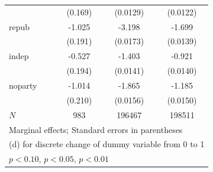 {\begin{tabular}{l*{3}{c}}
            &     (0.169)         &    (0.0129)         &    (0.0122)         \\
[1em]
repub       &      -1.025\sym{***}&      -3.198\sym{***}&      -1.699\sym{***}\\
            &     (0.191)         &    (0.0173)         &    (0.0139)         \\
[1em]
indep       &      -0.527\sym{***}&      -1.403\sym{***}&      -0.921\sym{***}\\
            &     (0.194)         &    (0.0141)         &    (0.0140)         \\
[1em]
noparty     &      -1.014\sym{***}&      -1.865\sym{***}&      -1.185\sym{***}\\
            &     (0.210)         &    (0.0156)         &    (0.0150)         \\
\hline
\(N\)       &         983         &      196467         &      198511         \\
\hline\hline
\multicolumn{4}{l}{\footnotesize Marginal effects; Standard errors in parentheses}\\
\multicolumn{4}{l}{\footnotesize  (d) for discrete change of dummy variable from 0 to 1}\\
\multicolumn{4}{l}{\footnotesize \sym{*} \(p<0.10\), \sym{**} \(p<0.05\), \sym{***} \(p<0.01\)}\\
\end{tabular}
}
